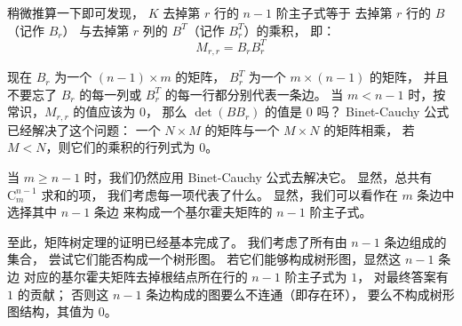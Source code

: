 \documentclass[UTF8]{article}
\begin{document}
	稍微推算一下即可发现，
	$K$ 去掉第 $r$ 行的 $n - 1$ 阶主子式等于
	去掉第 $r$ 行的 $B$（记作 $B_r$） 
	与去掉第 $r$ 列的 $B^T$（记作 $B^T_r$）的乘积，
	即：
	$$
	M_{r, r} = B_r B^T_r
	$$

	现在 $B_r$ 为一个 $(n - 1) \times m$ 的矩阵，
	$B^T_r$ 为一个 $m \times (n - 1)$ 的矩阵，
	并且不要忘了 $B_r$ 的每一列或 $B^T_r$ 的每一行都分别代表一条边。
	当 $m < n - 1$ 时，按常识，$M_{r, r}$ 的值应该为 $0$，
	那么 $\det(B B_r)$ 的值是 $0$ 吗？
	Binet-Cauchy 公式已经解决了这个问题：
	一个 $N \times M$ 的矩阵与一个 $M \times N$ 的矩阵相乘，
	若 $M < N$，则它们的乘积的行列式为 $0$。 

	当 $m \ge n - 1$ 时，我们仍然应用 Binet-Cauchy 公式去解决它。
	显然，总共有 $\mathrm{C}_{m}^{n - 1}$ 求和的项，
	我们考虑每一项代表了什么。
	显然，我们可以看作在 $m$ 条边中选择其中 $n - 1$ 条边
	来构成一个基尔霍夫矩阵的 $n - 1$ 阶主子式。
	
	\bigskip

	至此，矩阵树定理的证明已经基本完成了。
	我们考虑了所有由 $n - 1$ 条边组成的集合，
	尝试它们能否构成一个树形图。
	若它们能够构成树形图，显然这 $n - 1$ 条边
	对应的基尔霍夫矩阵去掉根结点所在行的 $n - 1$ 阶主子式为 $1$，
	对最终答案有 $1$ 的贡献；
	否则这 $n - 1$ 条边构成的图要么不连通（即存在环），
	要么不构成树形图结构，其值为 $0$。
	
	\bigskip

	{}
\end{document}

